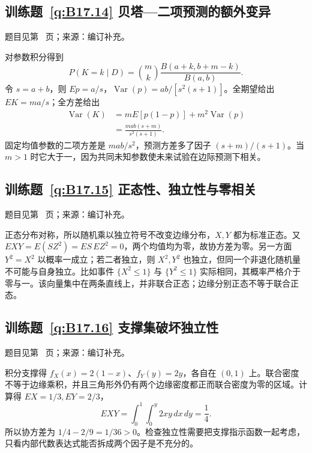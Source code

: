 \subsection*{训练题~\ref{q:B17.14} 贝塔—二项预测的额外变异}\label{a:B17.14}{\small 题目见第~\pageref{q:B17.14} 页；来源：编订补充。}
\begin{solve}对参数积分得到\[P(K=k\mid D)=\binom mk\frac{B(a+k,b+m-k)}{B(a,b)}.\]令 $s=a+b$，则 $Ep=a/s$，$\operatorname{Var}(p)=ab/[s^2(s+1)]$。全期望给出 $EK=ma/s$；全方差给出\[\begin{aligned}\operatorname{Var}(K)&=mE[p(1-p)]+m^2\operatorname{Var}(p)\\&=\frac{mab(s+m)}{s^2(s+1)}.\end{aligned}\]固定均值参数的二项方差是 $mab/s^2$，预测方差多了因子 $(s+m)/(s+1)$。当 $m>1$ 时它大于一，因为共同未知参数使未来试验在边际预测下相关。\end{solve}

\subsection*{训练题~\ref{q:B17.15} 正态性、独立性与零相关}\label{a:B17.15}{\small 题目见第~\pageref{q:B17.15} 页；来源：编订补充。}
\begin{solve}正态分布对称，所以随机乘以独立符号不改变边缘分布，$X,Y$ 都为标准正态。又 $EXY=E(SZ^2)=ES\,EZ^2=0$，两个均值均为零，故协方差为零。另一方面 $Y^2=X^2$ 以概率一成立；若二者独立，则 $X^2,Y^2$ 也独立，但同一个非退化随机量不可能与自身独立。比如事件 $\{X^2\le1\}$ 与 $\{Y^2\le1\}$ 实际相同，其概率严格介于零与一。该向量集中在两条直线上，并非联合正态；边缘分别正态不等于联合正态。\end{solve}

\subsection*{训练题~\ref{q:B17.16} 支撑集破坏独立性}\label{a:B17.16}{\small 题目见第~\pageref{q:B17.16} 页；来源：编订补充。}
\begin{solve}积分支撑得 $f_X(x)=2(1-x)$、$f_Y(y)=2y$，各自在 $(0,1)$ 上。联合密度不等于边缘乘积，并且三角形外仍有两个边缘密度都正而联合密度为零的区域。计算得 $EX=1/3,EY=2/3$，\[EXY=\int_0^1\int_0^y2xy\,dx\,dy=\frac14.\]所以协方差为 $1/4-2/9=1/36>0$。检查独立性需要把支撑指示函数一起考虑，只看内部代数表达式能否拆成两个因子是不充分的。\end{solve}

